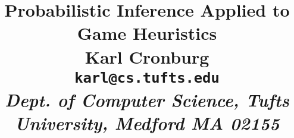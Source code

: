 \documentclass[pldi]{sigplanconf-pldi15}
\begin{document}
\title{Probabilistic Inference Applied to Game Heuristics\\
  \null
  {\small \textnormal{
    Karl Cronburg\\
    \texttt{karl@cs.tufts.edu}\\
    \emph{Dept. of Computer Science, Tufts University, Medford MA 02155}\\
  }}
}

\maketitle
\begin{abstract}
\end{abstract}











%
%

%
\end{document}
